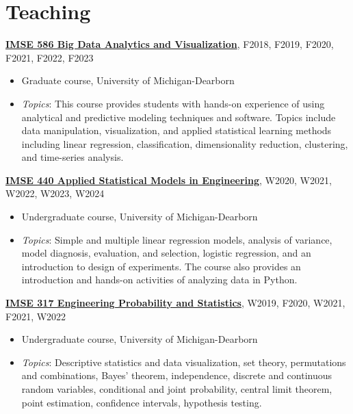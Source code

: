\documentclass[11pt]{article}
\newenvironment{main}
{\begin{adjustwidth}{3em}{}}
{\end{adjustwidth}}
\begin{document}
\section*{Teaching}
\begin{main}

\textbf{\href{https://imse586.github.io/}{IMSE 586 Big Data Analytics and Visualization}}, F2018, F2019, F2020, F2021, F2022, F2023

\begin{itemize}
    \item[] Graduate course, University of Michigan-Dearborn 
    \item[] \textit{Topics}: This course provides students with hands-on experience of using analytical and predictive modeling techniques and software. Topics include data manipulation, visualization, and applied statistical learning methods including linear regression, classification, dimensionality reduction, clustering, and time-series analysis. 
\end{itemize}


\textbf{\href{https://www.imse440.org/}{IMSE 440 Applied Statistical Models in Engineering}}, W2020, W2021, W2022, W2023, W2024

\begin{itemize}
    \item[] Undergraduate course, University of Michigan-Dearborn
    \item[] \textit{Topics}: Simple and multiple linear regression models, analysis of variance, model diagnosis, evaluation, and selection, logistic regression, and an introduction to design of experiments. The course also provides an introduction and hands-on activities of analyzing data in Python.
\end{itemize}


\textbf{\href{https://imse317.github.io/}{IMSE 317 Engineering Probability and Statistics}}, W2019, F2020, W2021, F2021, W2022

\begin{itemize}
    \item[] Undergraduate course, University of Michigan-Dearborn
    \item[] \textit{Topics}: Descriptive statistics and data visualization, set theory, permutations and combinations, Bayes’ theorem, independence, discrete and continuous random variables, conditional and joint probability, central limit theorem, point estimation, confidence intervals, hypothesis testing. 
\end{itemize}



\end{main}
\end{document}
